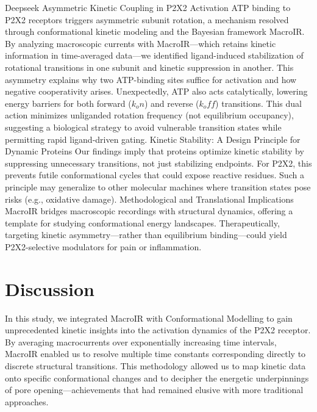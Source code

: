 \documentclass[pdflatex,sn-mathphys-num]{sn-jnl}%
\theoremstyle{thmstyleone}%
\theoremstyle{thmstyletwo}%
\theoremstyle{thmstylethree}%
\begin{document}
Deepseek
Asymmetric Kinetic Coupling in P2X2 Activation
ATP binding to P2X2 receptors triggers asymmetric subunit rotation, a mechanism resolved through conformational kinetic modeling and the Bayesian framework MacroIR. By analyzing macroscopic currents with MacroIR—which retains kinetic information in time-averaged data—we identified ligand-induced stabilization of rotational transitions in one subunit and kinetic suppression in another. This asymmetry explains why two ATP-binding sites suffice for activation and how negative cooperativity arises. Unexpectedly, ATP also acts catalytically, lowering energy barriers for both forward ($k_on$) and reverse ($k_off$) transitions. This dual action minimizes unliganded rotation frequency (not equilibrium occupancy), suggesting a biological strategy to avoid vulnerable transition states while permitting rapid ligand-driven gating.
Kinetic Stability: A Design Principle for Dynamic Proteins
Our findings imply that proteins optimize kinetic stability by suppressing unnecessary transitions, not just stabilizing endpoints. For P2X2, this prevents futile conformational cycles that could expose reactive residues. Such a principle may generalize to other molecular machines where transition states pose risks (e.g., oxidative damage).
Methodological and Translational Implications
MacroIR bridges macroscopic recordings with structural dynamics, offering a template for studying conformational energy landscapes. Therapeutically, targeting kinetic asymmetry—rather than equilibrium binding—could yield P2X2-selective modulators for pain or inflammation.
\section*{Discussion}
In this study, we integrated MacroIR with Conformational Modelling to gain unprecedented kinetic insights into the activation dynamics of the P2X2 receptor. By averaging macrocurrents over exponentially increasing time intervals, MacroIR enabled us to resolve multiple time constants corresponding directly to discrete structural transitions. This methodology allowed us to map kinetic data onto specific conformational changes and to decipher the energetic underpinnings of pore opening—achievements that had remained elusive with more traditional approaches.
\end{document}
